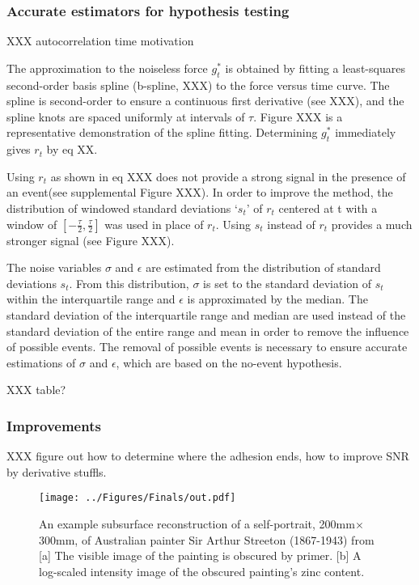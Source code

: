 \documentclass[%
  aip,12pt,tightenlines,
  amsthm,
 amsmath,amssymb
]{article}
\newcommand{\fLabel}[1]{\label{figure:#1}}
\newcommand{\pcaption}[1]{\caption{\noindent#1}}
\newcommand{\pl}[0]{\vspace{6pt}}
\newcommand{\pEndF}[0]{ \\ }
\newcommand{\pStartF}[0]{ }
\begin{document}
\subsubsection{Accurate estimators for hypothesis testing}

XXX autocorrelation time motivation \pl 

The approximation to the noiseless force $g^{*}_t$ is obtained by fitting a least-squares second-order basis spline (b-spline, XXX) to the force versus time curve. The spline is second-order to ensure a continuous first derivative (see XXX), and the spline knots are spaced uniformly at intervals of $\tau$. Figure XXX is a representative demonstration of the spline fitting. Determining  $g^{*}_t$ immediately gives $r_t$ by eq XX.  \pl

Using $r_t$ as shown in eq XXX does not provide a strong signal in the presence of an event(see supplemental Figure XXX). In order to improve the method, the distribution of windowed standard deviations `$s_t$' of $r_t$ centered at t with a window of $[-\frac{\tau}{2},\frac{\tau}{2}]$ was used in place of $r_t$. Using $s_t$ instead of $r_t$ provides a much stronger signal (see Figure XXX).  \pl

The noise variables $\sigma$ and $\epsilon$ are estimated from the distribution of standard deviations $s_t$. From this distribution, $\sigma$ is set to the standard deviation of $s_t$ within the interquartile range and $\epsilon$ is approximated by the median. The standard deviation of the interquartile range and median are used instead of the standard deviation of the entire range and mean in order to remove the influence of possible events. The removal of possible events is necessary to ensure accurate estimations of $\sigma$ and $\epsilon$, which are based on the no-event hypothesis.

XXX table?

\subsubsection{Improvements}

XXX figure out how to determine where the adhesion ends, how to improve SNR by derivative stuffls.


\begin{figure}
\centering
\texttt{[image: ../Figures/Finals/out.pdf]}%
\pcaption{\noindent\fLabel{Cartoon}\pStartF An example subsurface reconstruction of a self-portrait, 200mm$\times$300mm, of Australian painter Sir Arthur Streeton (1867-1943) from \citet{howard_high-definition_2012} [a] The visible image of the painting is obscured by primer. [b] A log-scaled intensity image of the obscured painting's zinc content. \pEndF }
\end{figure}
\end{document}
